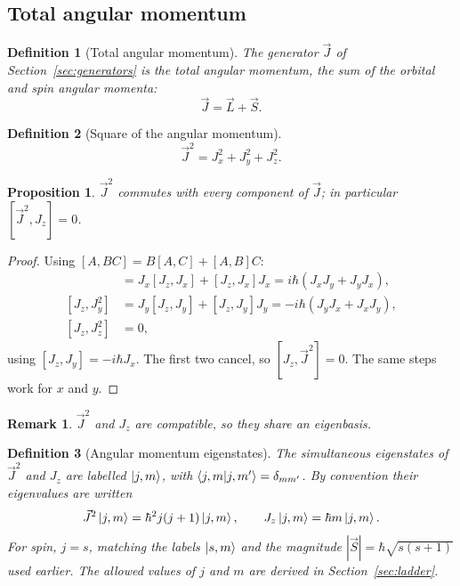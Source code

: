 \documentclass{article}
\newtheorem{definition}{Definition}
\newtheorem{remark}{Remark}
\newtheorem{proposition}{Proposition}
\begin{document}
\subsection{Total angular momentum}
\begin{definition}[Total angular momentum]
    The generator $\vec{J}$ of Section~\ref{sec:generators} is the total angular momentum, the sum of the orbital and spin angular momenta:
    \begin{equation}
        \vec{J} = \vec{L} + \vec{S}.
    \end{equation}
\end{definition}
\begin{definition}[Square of the angular momentum]
    \begin{equation}
        \vec{J}^2 = J_x^2 + J_y^2 + J_z^2.
    \end{equation}
\end{definition}
\begin{proposition}
    $\vec{J}^2$ commutes with every component of $\vec{J}$; in particular $[\vec{J}^2, J_z] = 0$.
\end{proposition}
\begin{proof}
    Using $[A,BC] = B[A,C] + [A,B]C$:
    \begin{align*}
        [J_z, J_x^2] &= J_x[J_z,J_x] + [J_z,J_x]J_x = i\hbar\left(J_xJ_y + J_yJ_x\right), \\
        [J_z, J_y^2] &= J_y[J_z,J_y] + [J_z,J_y]J_y = -i\hbar\left(J_yJ_x + J_xJ_y\right), \\
        [J_z, J_z^2] &= 0,
    \end{align*}
    using $[J_z,J_y] = -i\hbar J_x$. The first two cancel, so $[J_z,\vec{J}^2] = 0$. The same steps work for $x$ and $y$.
\end{proof}
\begin{remark}
    $\vec{J}^2$ and $J_z$ are compatible, so they share an eigenbasis.
\end{remark}
\begin{definition}[Angular momentum eigenstates]
    The simultaneous eigenstates of $\vec{J}^2$ and $J_z$ are labelled $\ket{j,m}$, with $\braket{j,m|j,m'} = \delta_{mm'}$. By convention their eigenvalues are written
    \begin{equation}
        \label{eq:jm}
        \vec{J}^2\ket{j,m} = \hbar^2 j(j+1)\ket{j,m}, \qquad J_z\ket{j,m} = \hbar m\ket{j,m}.
    \end{equation}
    For spin, $j = s$, matching the labels $\ket{s,m}$ and the magnitude $|\vec{S}| = \hbar\sqrt{s(s+1)}$ used earlier. The allowed values of $j$ and $m$ are derived in Section~\ref{sec:ladder}.
\end{definition}
\end{document}
